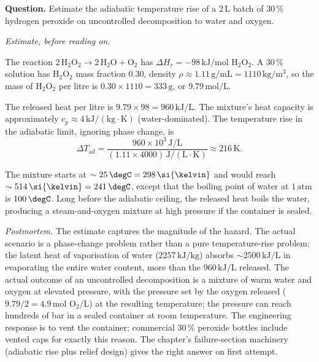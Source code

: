 \begin{estimation}
\textbf{Question.} Estimate the adiabatic temperature rise of a
$2\,\text{L}$ batch of $30\,\%$ hydrogen peroxide on uncontrolled
decomposition to water and oxygen.

\smallskip
\textit{Estimate, before reading on.}

\smallskip
The reaction $2\,\text{H}_2\text{O}_2 \to 2\,\text{H}_2\text{O} +
\text{O}_2$ has $\Delta H_r = -98\,\text{kJ}/\text{mol H}_2\text{O}_2$.
A $30\,\%$ solution has H$_2$O$_2$ mass fraction $0.30$, density
$\rho \approx 1.11\,\text{g}/\text{mL} = 1110\,\text{kg}/\text{m}^3$,
so the mass of H$_2$O$_2$ per litre is $0.30 \times 1110 = 333\,\text{g}$,
or $9.79\,\text{mol}/\text{L}$.

The released heat per litre is $9.79 \times 98 = 960\,\text{kJ}/\text{L}$.
The mixture's heat capacity is approximately $c_p \approx 4\,\text{kJ}/
(\text{kg}\cdot\si{\kelvin})$ (water-dominated). The temperature rise
in the adiabatic limit, ignoring phase change, is
\[
\Delta T_{\text{ad}} = \frac{960 \times 10^3\,\text{J}/\text{L}}{(1.11
\times 4000)\,\text{J}/(\text{L}\cdot\si{\kelvin})} \approx 216\,
\si{\kelvin}.
\]

The mixture starts at $\sim 25\,\degC = 298\,\si{\kelvin}$ and would
reach $\sim 514\,\si{\kelvin} = 241\,\degC$, except that the boiling
point of water at $1\,\text{atm}$ is $100\,\degC$. Long before the
adiabatic ceiling, the released heat boils the water, producing a
steam-and-oxygen mixture at high pressure if the container is sealed.

\smallskip
\textit{Postmortem.} The estimate captures the magnitude of the
hazard. The actual scenario is a phase-change problem rather than a
pure temperature-rise problem; the latent heat of vaporisation of
water ($2257\,\text{kJ}/\text{kg}$) absorbs $\sim 2500\,\text{kJ}/
\text{L}$ in evaporating the entire water content, more than the
$960\,\text{kJ}/\text{L}$ released. The actual outcome of an
uncontrolled decomposition is a mixture of warm water and oxygen at
elevated pressure, with the pressure set by the oxygen released
($9.79/2 = 4.9\,\text{mol O}_2/\text{L}$) at the resulting
temperature; the pressure can reach hundreds of bar in a sealed
container at room temperature. The engineering response is to vent
the container; commercial $30\,\%$ peroxide bottles include vented
caps for exactly this reason. The chapter's failure-section
machinery (adiabatic rise plus relief design) gives the right answer
on first attempt.
\end{estimation}

